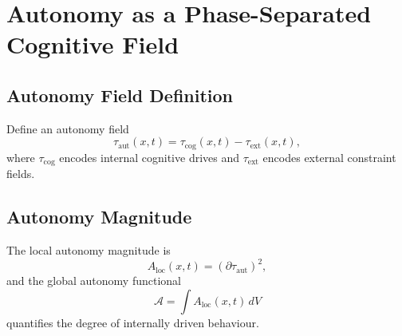 \chapter{Autonomy as a Phase-Separated Cognitive Field}

\section{Autonomy Field Definition}
Define an autonomy field
\[
\tau_{\mathrm{aut}}(x,t) = \tau_{\mathrm{cog}}(x,t) - \tau_{\mathrm{ext}}(x,t),
\]
where \(\tau_{\mathrm{cog}}\) encodes internal cognitive drives and \(\tau_{\mathrm{ext}}\) encodes external constraint fields.

\section{Autonomy Magnitude}
The local autonomy magnitude is
\[
A_{\mathrm{loc}}(x,t) = (\partial\tau_{\mathrm{aut}})^2,
\]
and the global autonomy functional
\[
\mathcal{A} = \int A_{\mathrm{loc}}(x,t)\, dV
\]
quantifies the degree of internally driven behaviour.

